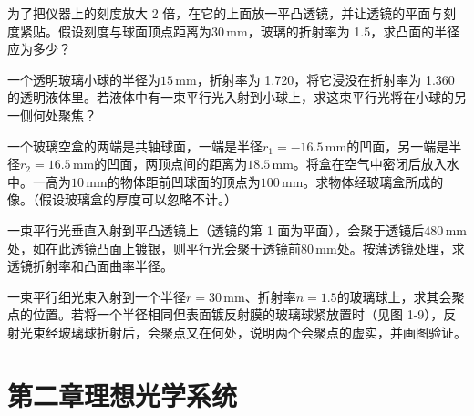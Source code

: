 \documentclass[standard, analysis, notocnum]{ExBook}
\newcommand{\answerarea}[1][8cm]{%
  \par\vspace{2mm}%
  \noindent{\color{themeColor!35}\rule{\linewidth}{0.4pt}}\par
  \noindent\begin{minipage}[t][#1][t]{\linewidth}\vspace{0pt}\end{minipage}\par
  \noindent{\color{themeColor!35}\rule{\linewidth}{0.4pt}}\par
}
\begin{document}
\begin{qitems}[startnum=6]
\qitem 为了把仪器上的刻度放大 2 倍，在它的上面放一平凸透镜，并让透镜的平面与刻度紧贴。假设刻度与球面顶点距离为$30\,\mathrm{mm}$，玻璃的折射率为 1.5，求凸面的半径应为多少？
\label{q:15:start}
\answerarea[8cm]
\label{q:15:end}
\end{qitems}

\begin{qitems}[startnum=7]
\qitem 一个透明玻璃小球的半径为$15\,\mathrm{mm}$，折射率为 1.720，将它浸没在折射率为 1.360 的透明液体里。若液体中有一束平行光入射到小球上，求这束平行光将在小球的另一侧何处聚焦？
\label{q:16:start}
\answerarea[8cm]
\label{q:16:end}
\end{qitems}

\begin{qitems}[startnum=8]
\qitem 一个玻璃空盒的两端是共轴球面，一端是半径$r_{1}=-16.5\,\mathrm{mm}$的凹面，另一端是半径$r_{2}=16.5\,\mathrm{mm}$的凹面，两顶点间的距离为$18.5\,\mathrm{mm}$。将盒在空气中密闭后放入水中。一高为$10\,\mathrm{mm}$的物体距前凹球面的顶点为$100\,\mathrm{mm}$。求物体经玻璃盒所成的像。（假设玻璃盒的厚度可以忽略不计。）
\label{q:17:start}
\answerarea[8cm]
\label{q:17:end}
\end{qitems}

\begin{qitems}[startnum=9]
\qitem 一束平行光垂直入射到平凸透镜上（透镜的第 1 面为平面），会聚于透镜后$480\,\mathrm{mm}$处，如在此透镜凸面上镀银，则平行光会聚于透镜前$80\,\mathrm{mm}$处。按薄透镜处理，求透镜折射率和凸面曲率半径。
\label{q:18:start}
\answerarea[8cm]
\label{q:18:end}
\end{qitems}

\begin{qitems}[startnum=10]
\qitem 一束平行细光束入射到一个半径$r=30\,\mathrm{mm}$、折射率$n=1.5$的玻璃球上，求其会聚点的位置。若将一个半径相同但表面镀反射膜的玻璃球紧放置时（见图 1-9），反射光束经玻璃球折射后，会聚点又在何处，说明两个会聚点的虚实，并画图验证。
\label{q:19:start}
\answerarea[8cm]
\label{q:19:end}
\end{qitems}

\section{第二章\quad 理想光学系统}
\end{document}
